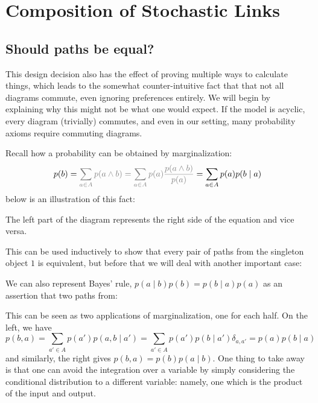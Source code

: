 \documentclass{article}
\begin{document}
	\section{Composition of Stochastic Links}


	
	
	\subsection{Should paths be equal?}
	
	This design decision also has the effect of proving multiple ways to calculate things, which leads to the somewhat counter-intuitive fact that that not all diagrams commute, even ignoring preferences entirely. We will begin by explaining why this might not be what one would expect. If the model is acyclic, every diagram (trivially) commutes, and even in our setting, many probability axioms require commuting diagrams.
	
	\begin{example}[Marginalization]
		Recall how a probability can be obtained by marginalization:
		\[ p(b) = {\color{gray}\sum_{a \in A} p(a \land b) = \sum_{a \in A} p(a) \frac{p(a\land b)}{p(a)} }= \sum_{a \in A} p(a) p(b\mid a) \]
		below is an illustration of this fact:
		\begin{center}
		\end{center}
		The left part of the diagram represents the right side of the equation and vice versa. 
	\end{example} 

	This can be used inductively to show that every pair of paths from the singleton object $1$ is equivalent, but before that we will deal with another important case:
	
	\begin{example} \label{ex:bayesrule}
		We can also represent Bayes' rule, $p(a \mid b) p(b) = p(b \mid a) p(a)$ as an assertion that two paths from:
		\begin{center}
		\end{center}
		This can be seen as two applications of marginalization, one for each half. On the left, we have
		\[ p(b, a) = \sum_{a' \in A} p(a')p(a,b \mid a') = \sum_{a' \in A} p(a') p(b \mid a') \delta_{a,a'} = p(a) p(b \mid a) \]
		and similarly, the right gives $p(b,a) = p(b) p(a \mid b)$. One thing to take away is that one can avoid the integration over a variable by simply considering the conditional distribution to a different variable: namely, one which is the product of the input and output. 
	\end{example}
	
\end{document}
